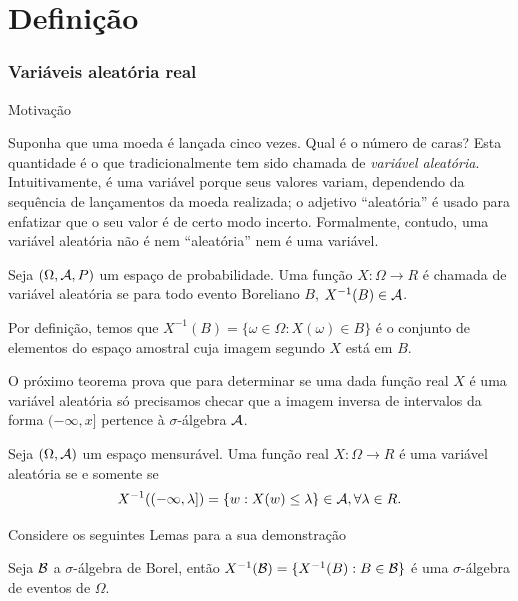 \section{Definição}
\begin{frame}
\frametitle{\textbf{Variáveis aleatória real}}
\baselineskip=13pt
\begin{block}{Motivação}
	
	Suponha que uma moeda é lançada cinco vezes. Qual é o número de
	caras? Esta quantidade é o que tradicionalmente tem sido chamada de
	{\em variável aleatória}. Intuitivamente, é uma variável porque seus
	valores variam, dependendo da sequência de lançamentos da moeda
	realizada; o adjetivo ``aleatória'' é usado para enfatizar que o seu
	valor é de certo modo incerto. Formalmente, contudo, uma variável
	aleatória não é nem ``aleatória'' nem é uma variável.
\end{block}


\begin{defi}
	Seja $(\Omega,{\cal A},P)$ um espaço de probabilidade. Uma função
	$X:\Omega \rightarrow R$ é chamada de variável aleatória se para
	todo evento Boreliano $B$, $X^{-1}(B)\in {\cal A}$.
\end{defi}

Por definição, temos que $X^{-1}(B)=\{\omega\in\Omega:X(\omega)\in
B\}$ é o conjunto de elementos do espaço amostral cuja imagem segundo $X$ está em $B$.

O próximo teorema prova que para determinar se uma dada função real $X$ é uma variável aleatória só precisamos checar que a imagem inversa de intervalos da
forma $(-\infty,x]$ pertence à $\sigma$-álgebra ${\cal A}$.
\end{frame}
%
%
\begin{frame}
\baselineskip=13pt



\begin{teo}
	\label{teo1}
	Seja $(\Omega,{\cal A})$ um espaço mensurável. Uma função real $X:\Omega
	\rightarrow R$ é uma variável aleatória se e somente se
	$$X^{-1}((-\infty,\lambda])=\{w:X(w)\leq \lambda\}\in {\cal A}, \forall \lambda\in R.$$
\end{teo}

Considere os seguintes Lemas para a sua demonstração

\begin{lema}\label{lem1}
	Seja ${\cal B}$ a $\sigma$-álgebra de Borel, então
	$X^{-1}({\cal B})=\{X^{-1}(B):B\in {\cal B}\}$ é uma $\sigma$-álgebra de eventos
	de $\Omega$.
\end{lema}

\end{frame}

